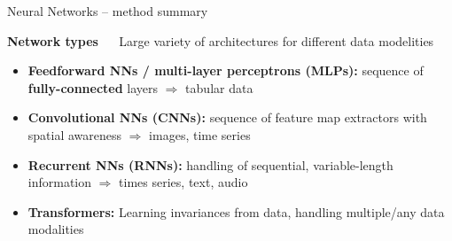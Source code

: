 \documentclass[11pt,compress,t,notes=noshow, xcolor=table]{beamer}
\newcommand{\highlight}[1]{\textcolor{hlcol}{\textbf{#1}}}
\begin{document}
\begin{frame2}{Neural Networks -- method summary}

  \highlight{Network types} ~~ Large variety of architectures for different data modelities
\begin{itemize}
  \item \textbf{Feedforward NNs / multi-layer perceptrons (MLPs):} sequence of 
  \textbf{fully-connected} layers $\Rightarrow$ tabular data
  \item \textbf{Convolutional NNs (CNNs):} sequence of feature map extractors 
  with spatial awareness $\Rightarrow$ images, time series
  \item \textbf{Recurrent NNs (RNNs):} handling of sequential, variable-length 
  information $\Rightarrow$ times series, text, audio
  \item \textbf{Transformers:} Learning invariances from data, handling multiple/any data modalities
\end{itemize}


\end{frame2}
\end{document}
